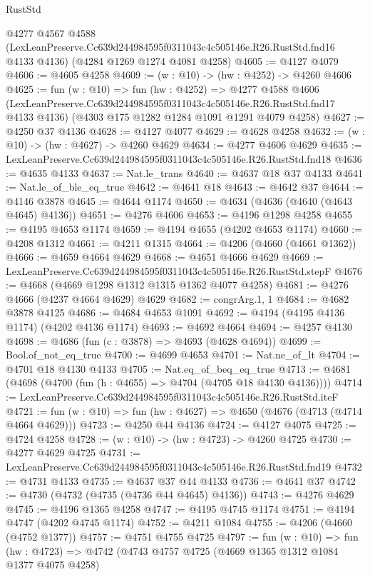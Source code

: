 \begin{lexlean}{RustStd}
\begin{coremodule}
  @4277
    @4567
    @4588
    (LexLeanPreserve.Cc639d244984595f0311043c4c505146e.R26.RustStd.fnd16 @4133 @4136)
    (@4284 @1269 @1274 @4081 @4258)
@4605 := @4127 @4079
@4606 := @4605 @4258
@4609 := (w : @10) -> (hw : @4252) -> @4260 @4606
@4625 := fun (w : @10) =>
  fun (hw : @4252) =>
  @4277
    @4588
    @4606
    (LexLeanPreserve.Cc639d244984595f0311043c4c505146e.R26.RustStd.fnd17 @4133 @4136)
    (@4303 @175 @1282 @1284 @1091 @1291 @4079 @4258)
@4627 := @4250 @37 @4136
@4628 := @4127 @4077
@4629 := @4628 @4258
@4632 := (w : @10) -> (hw : @4627) -> @4260 @4629
@4634 := @4277 @4606 @4629
@4635 := LexLeanPreserve.Cc639d244984595f0311043c4c505146e.R26.RustStd.fnd18
@4636 := @4635 @4133
@4637 := Nat.le_trans
@4640 := @4637 @18 @37 @4133
@4641 := Nat.le_of_ble_eq_true
@4642 := @4641 @18
@4643 := @4642 @37
@4644 := @4146 @3878
@4645 := @4644 @1174
@4650 := @4634 (@4636 (@4640 (@4643 @4645) @4136))
@4651 := @4276 @4606
@4653 := @4196 @1298 @4258
@4655 := @4195 @4653 @1174
@4659 := @4194 @4655 (@4202 @4653 @1174)
@4660 := @4208 @1312
@4661 := @4211 @1315
@4664 := @4206 (@4660 (@4661 @1362))
@4666 := @4659 @4664 @4629
@4668 := @4651 @4666 @4629
@4669 := LexLeanPreserve.Cc639d244984595f0311043c4c505146e.R26.RustStd.stepF
@4676 := @4668 (@4669 @1298 @1312 @1315 @1362 @4077 @4258)
@4681 := @4276 @4666 (@4237 @4664 @4629) @4629
@4682 := congrArg.{1, 1}
@4684 := @4682 @3878 @4125
@4686 := @4684 @4653 @1091
@4692 := @4194 (@4195 @4136 @1174) (@4202 @4136 @1174)
@4693 := @4692 @4664
@4694 := @4257 @4130
@4698 := @4686 (fun (c : @3878) => @4693 (@4628 @4694))
@4699 := Bool.of_not_eq_true
@4700 := @4699 @4653
@4701 := Nat.ne_of_lt
@4704 := @4701 @18 @4130 @4133
@4705 := Nat.eq_of_beq_eq_true
@4713 := @4681 (@4698 (@4700 (fun (h : @4655) => @4704 (@4705 @18 @4130 @4136))))
@4714 := LexLeanPreserve.Cc639d244984595f0311043c4c505146e.R26.RustStd.iteF
@4721 := fun (w : @10) => fun (hw : @4627) => @4650 (@4676 (@4713 (@4714 @4664 @4629)))
@4723 := @4250 @44 @4136
@4724 := @4127 @4075
@4725 := @4724 @4258
@4728 := (w : @10) -> (hw : @4723) -> @4260 @4725
@4730 := @4277 @4629 @4725
@4731 := LexLeanPreserve.Cc639d244984595f0311043c4c505146e.R26.RustStd.fnd19
@4732 := @4731 @4133
@4735 := @4637 @37 @44 @4133
@4736 := @4641 @37
@4742 := @4730 (@4732 (@4735 (@4736 @44 @4645) @4136))
@4743 := @4276 @4629
@4745 := @4196 @1365 @4258
@4747 := @4195 @4745 @1174
@4751 := @4194 @4747 (@4202 @4745 @1174)
@4752 := @4211 @1084
@4755 := @4206 (@4660 (@4752 @1377))
@4757 := @4751 @4755 @4725
@4797 := fun (w : @10) =>
  fun (hw : @4723) =>
  @4742
    (@4743
      @4757
      @4725
      (@4669 @1365 @1312 @1084 @1377 @4075 @4258)

\end{coremodule}
\end{lexlean}
